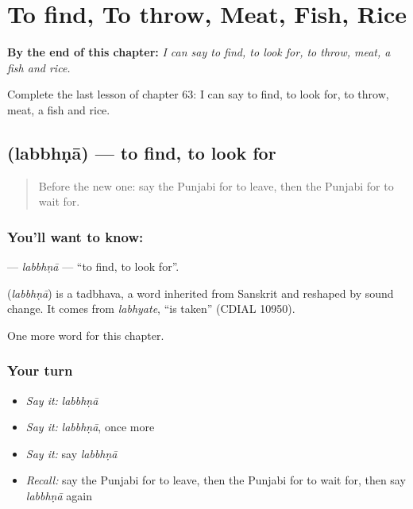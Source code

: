 
\chapter{To find, To throw, Meat, Fish, Rice}
\label{ch:pa-to-find-to-throw-meat-fish-rice}

\begin{chapteropening}
\textbf{By the end of this chapter:} \emph{I can say to find, to look for, to throw, meat, a fish and rice.}

Complete the last lesson of chapter 63: I can say to find, to look for, to throw, meat, a fish and rice.
\end{chapteropening}

\section[\texorpdfstring{\pa{ਲੱਭਣਾ} (labbhṇā)}{ਲੱਭਣਾ (labbhṇā)}]{ (labbhṇā) — to find, to look for}

\label{lesson:PA-C63-labbhna}



\begin{quote}
Before the new one: say the Punjabi for to leave, then the Punjabi for to wait for.
\end{quote}

\subsection*{You'll want to know: }
\textbf{} — \emph{labbhṇā} — \textquotedblleft{}to find, to look for\textquotedblright{}.

\begin{cousinweb}
\textbf{} (\emph{labbhṇā}) is a tadbhava, a word inherited from Sanskrit and reshaped by sound change. It comes from \emph{labhyate}, \textquotedblleft{}is taken\textquotedblright{} (CDIAL 10950).
\end{cousinweb}

\begin{grammarlens}[title={What you've built}]
One more word for this chapter.
\end{grammarlens}

\subsection*{Your turn}
\begin{itemize}
\raggedright
  \item \emph{Say it:} \emph{labbhṇā}
  \item \emph{Say it:} \emph{labbhṇā}, once more
  \item \emph{Say it:} say \emph{labbhṇā}
  \item \emph{Recall:} say the Punjabi for to leave, then the Punjabi for to wait for, then say \emph{labbhṇā} again
\end{itemize}

